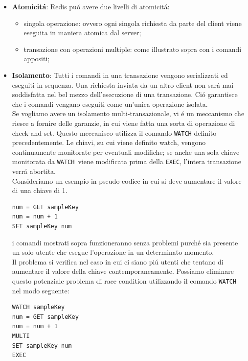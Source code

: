 \begin{itemize}
    \item \textbf{Atomicitá}: Redis puó avere due livelli di atomicitá:
      \begin{itemize}
          \item singola operazione: ovvero ogni singola richiesta da parte del client viene eseguita in maniera atomica dal server;
          \item transazione con operazioni multiple: come illustrato sopra con i comandi appositi;
      \end{itemize}

    \item \textbf{Isolamento}:
    Tutti i comandi in una transazione vengono serializzati ed eseguiti in sequenza. Una richiesta inviata da un altro client
    non sará mai soddisfatta nel bel mezzo dell'esecuzione di una transazione. Ció garantisce che i comandi vengano eseguiti
    come un'unica operazione isolata.\\
    Se vogliamo avere un isolamento multi-transazionale, vi é un meccanismo che riesce a fornire delle garanzie, in cui viene fatta una sorta di operazione
    di check-and-set.
    Questo meccanisco utilizza il comando \texttt{WATCH} definito precedentemente.
    Le chiavi, su cui viene definito watch, vengono continuamente monitorate per eventuali modifiche; se anche una sola chiave monitorata
    da \texttt{WATCH }viene modificata prima della \texttt{EXEC}, l'intera transazione verrá abortita.\\

    Consideriamo un esempio in pseudo-codice in cui si deve aumentare il valore di una chiave di 1.

    \begin{lstlisting}[autogobble]
num = GET sampleKey
num = num + 1
SET sampleKey num\end{lstlisting}

    i comandi mostrati sopra funzioneranno senza problemi purché sia presente un solo utente che esegue l'operazione in un determinato momento.\\
    Il problema si verifica nel caso in cui ci siano piú utenti che tentano di aumentare il valore della chiave contemporaneamente.
    Possiamo eliminare questo potenziale problema di race condition utilizzando il comando \texttt{WATCH} nel modo seguente:

    \begin{lstlisting}[autogobble]
WATCH sampleKey
num = GET sampleKey
num = num + 1
MULTI
SET sampleKey num
EXEC\end{lstlisting}


\end{itemize}
